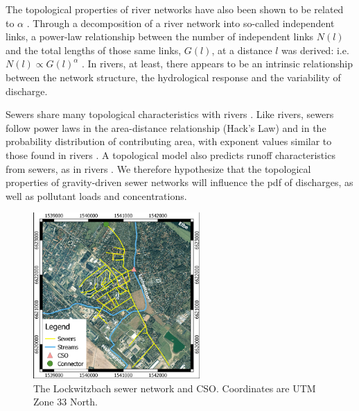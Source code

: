 \documentclass[draft,linenumbers]{agujournal2018}
\begin{document}
The topological properties of river networks have also been shown to be related to $\alpha$ \citep{Biswal_2014}. Through a decomposition of a river network into so-called independent links, a power-law relationship between the number of independent links $N(l)$ and the total lengths of those same links, $G(l)$, at a distance $l$ was derived: i.e. $N(l) \propto G(l)^\alpha$  \citep{Biswal_2010}. In rivers, at least, there appears to be an intrinsic relationship between the network structure, the hydrological response and the variability of discharge. 

Sewers share many topological characteristics with rivers \citep{Yang_2017}. Like rivers, sewers follow power laws in the area-distance relationship (Hack’s Law) and in the probability distribution of contributing area, with exponent values similar to those found in rivers \citep{Yang_2017}. A topological model also predicts runof\/f characteristics from sewers, as in rivers \citep{LHOMME_2004}. We therefore hypothesize that the topological properties of gravity-driven sewer networks will inf\/luence the pdf of discharges, as well as pollutant loads and concentrations.


\begin{figure}[h]
 \centering
\includegraphics[width=15pc]{Fig2.pdf}
 \caption{The Lockwitzbach sewer network and CSO. Coordinates are UTM Zone 33 North.}
 \label{figtwo}
  \end{figure}
\end{document}
